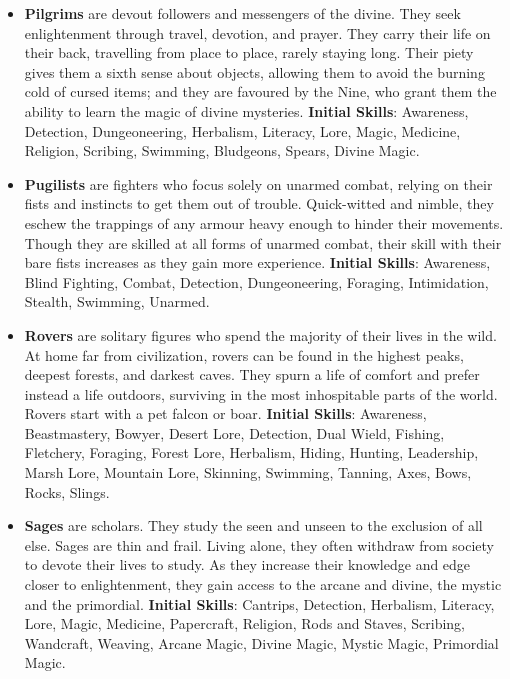 \begin{itemize}
\item {\bf Pilgrims} are devout followers and messengers of the divine.  
They seek enlightenment through travel, devotion, and prayer.  They carry 
their life on their back, travelling from place to place, rarely staying 
long.  Their piety gives them a sixth sense about objects, allowing them
to avoid the burning cold of cursed items; and they are favoured by the Nine, 
who grant them the ability to learn the magic of divine mysteries.
\textbf{Initial Skills}: Awareness, Detection, Dungeoneering, Herbalism,
Literacy, Lore, Magic, Medicine, Religion, Scribing, Swimming, Bludgeons, 
Spears, Divine Magic.

\item {\bf Pugilists} are fighters who focus solely on unarmed combat, 
relying on their fists and instincts to get them out of trouble.  
Quick-witted and nimble, they eschew the trappings of any armour heavy 
enough to hinder their movements.  Though they are skilled at all forms of
unarmed combat, their skill with their bare fists increases as they gain
more experience.  \textbf{Initial Skills}: Awareness, Blind Fighting, 
Combat, Detection, Dungeoneering, Foraging, Intimidation, Stealth, 
Swimming, Unarmed.

\item {\bf Rovers} are solitary figures who spend the majority of their 
lives in the wild.  At home far from civilization, rovers can be found in 
the highest peaks, deepest forests, and darkest caves.  They spurn a life 
of comfort and prefer instead a life outdoors, surviving in the most 
inhospitable parts of the world.  Rovers start with a pet falcon or boar.
\textbf{Initial Skills}: Awareness, Beastmastery, Bowyer, Desert Lore, 
Detection, Dual Wield, Fishing, Fletchery, Foraging, Forest Lore, Herbalism, 
Hiding, Hunting, Leadership, Marsh Lore, Mountain Lore, Skinning, Swimming, 
Tanning, Axes, Bows, Rocks, Slings.

\item {\bf Sages} are scholars.  They study the seen and unseen to the 
exclusion of all else.  Sages are thin and frail.  Living alone, they often
withdraw from society to devote their lives to study.  As they increase 
their knowledge and edge closer to enlightenment, they gain access to the 
arcane and divine, the mystic and the primordial.  \textbf{Initial Skills}:
Cantrips, Detection, Herbalism, Literacy, Lore, Magic, Medicine, Papercraft,
Religion, Rods and Staves, Scribing, Wandcraft, Weaving, Arcane Magic, 
Divine Magic, Mystic Magic, Primordial Magic.


\end{itemize}
